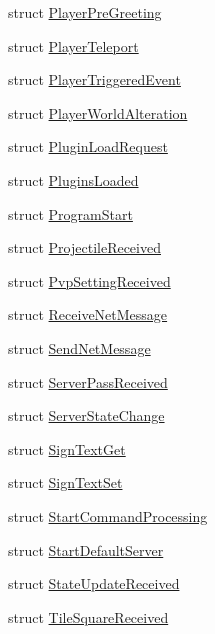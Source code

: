 \begin{DoxyCompactItemize}
\item 
struct \hyperlink{structOTA_1_1Plugin_1_1HookArgs_1_1PlayerPreGreeting}{Player\+Pre\+Greeting}
\item 
struct \hyperlink{structOTA_1_1Plugin_1_1HookArgs_1_1PlayerTeleport}{Player\+Teleport}
\item 
struct \hyperlink{structOTA_1_1Plugin_1_1HookArgs_1_1PlayerTriggeredEvent}{Player\+Triggered\+Event}
\item 
struct \hyperlink{structOTA_1_1Plugin_1_1HookArgs_1_1PlayerWorldAlteration}{Player\+World\+Alteration}
\item 
struct \hyperlink{structOTA_1_1Plugin_1_1HookArgs_1_1PluginLoadRequest}{Plugin\+Load\+Request}
\item 
struct \hyperlink{structOTA_1_1Plugin_1_1HookArgs_1_1PluginsLoaded}{Plugins\+Loaded}
\item 
struct \hyperlink{structOTA_1_1Plugin_1_1HookArgs_1_1ProgramStart}{Program\+Start}
\item 
struct \hyperlink{structOTA_1_1Plugin_1_1HookArgs_1_1ProjectileReceived}{Projectile\+Received}
\item 
struct \hyperlink{structOTA_1_1Plugin_1_1HookArgs_1_1PvpSettingReceived}{Pvp\+Setting\+Received}
\item 
struct \hyperlink{structOTA_1_1Plugin_1_1HookArgs_1_1ReceiveNetMessage}{Receive\+Net\+Message}
\item 
struct \hyperlink{structOTA_1_1Plugin_1_1HookArgs_1_1SendNetMessage}{Send\+Net\+Message}
\item 
struct \hyperlink{structOTA_1_1Plugin_1_1HookArgs_1_1ServerPassReceived}{Server\+Pass\+Received}
\item 
struct \hyperlink{structOTA_1_1Plugin_1_1HookArgs_1_1ServerStateChange}{Server\+State\+Change}
\item 
struct \hyperlink{structOTA_1_1Plugin_1_1HookArgs_1_1SignTextGet}{Sign\+Text\+Get}
\item 
struct \hyperlink{structOTA_1_1Plugin_1_1HookArgs_1_1SignTextSet}{Sign\+Text\+Set}
\item 
struct \hyperlink{structOTA_1_1Plugin_1_1HookArgs_1_1StartCommandProcessing}{Start\+Command\+Processing}
\item 
struct \hyperlink{structOTA_1_1Plugin_1_1HookArgs_1_1StartDefaultServer}{Start\+Default\+Server}
\item 
struct \hyperlink{structOTA_1_1Plugin_1_1HookArgs_1_1StateUpdateReceived}{State\+Update\+Received}
\item 
struct \hyperlink{structOTA_1_1Plugin_1_1HookArgs_1_1TileSquareReceived}{Tile\+Square\+Received}

\end{DoxyCompactItemize}
